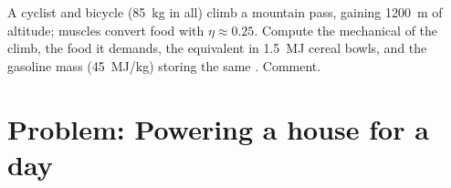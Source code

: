\begin{exercise}[$\star\star\star$]\label{exo:g10:energy-conservation:15}
A cyclist and bicycle (\qty{85}{kg} in all) climb a mountain pass,
gaining \qty{1200}{m} of altitude; muscles convert food with
$\eta \approx 0.25$.
Compute the mechanical  of the climb, the food  it
demands, the equivalent in \qty{1.5}{MJ} cereal bowls, and the
gasoline mass (\qty{45}{MJ/kg}) storing the same . Comment.
\end{exercise}

\section{Problem: Powering a house for a day}

